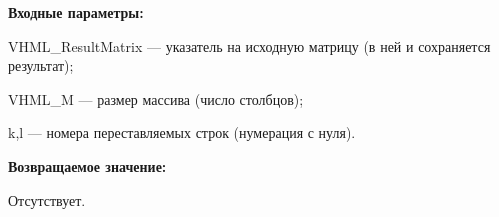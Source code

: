 \textbf{Входные параметры:}  
 
VHML\_ResultMatrix --- указатель на исходную матрицу (в ней и сохраняется результат);
 
VHML\_M --- размер массива (число столбцов);
 
k,l --- номера переставляемых строк (нумерация с нуля).

\textbf{Возвращаемое значение:}

Отсутствует.